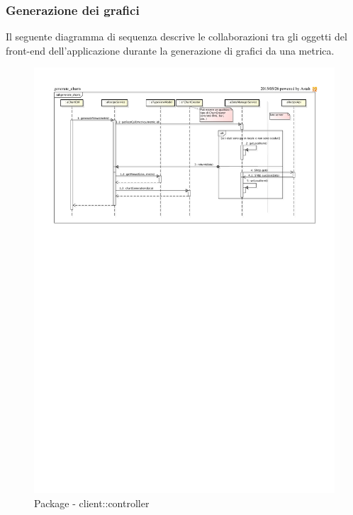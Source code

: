 	\subsubsection{Generazione dei grafici} %
	\label{sub:generazione_dei_grafici}
	Il seguente diagramma di sequenza descrive le collaborazioni tra gli oggetti del front-end dell'applicazione durante la generazione di grafici da una metrica. \newline

\begin{figure}[htbp]
	\centering
	\centerline{\includegraphics[scale=1.03]{./images/sequence_diagram/client_chart_generation.pdf}}
	\caption{Package - client::controller}
\end{figure}

	

